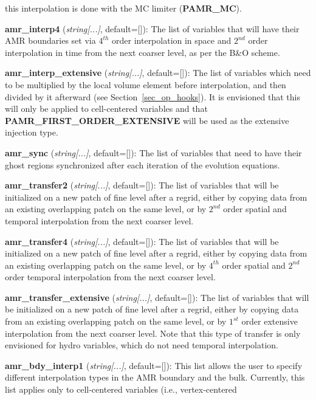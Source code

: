 \documentclass[aps,amssymb,unsortedaddress,nofootinbib]{revtex4}
\def\lsep{\itemsep 0.05in}
\begin{document}
\begin{list}{}{\lsep}
      this interpolation is done with the MC limiter ({\bf PAMR\_MC}).
\item {\bf amr\_interp4} ({\em string[...]}, default=[]):
      The list of variables that will have their AMR boundaries set
      via $4^{th}$ order interpolation in space and $2^{nd}$ order interpolation in time 
      from the next coarser level, as per the B\&O scheme.
\item {\bf amr\_interp\_extensive} ({\em string[...]}, default=[]):
      The list of variables which need to be multiplied by the local volume element
      before interpolation, and then divided by it afterward (see Section~\ref{sec_op_hooks}).
      It is envisioned that this will only be applied to cell-centered variables and that
      {\bf PAMR\_FIRST\_ORDER\_EXTENSIVE} will be used as the extensive injection type.
\item {\bf amr\_sync} ({\em string[...]}, default=[]):
      The list of variables that need to have their ghost regions synchronized
      after each iteration of the evolution equations.
\item {\bf amr\_transfer2} ({\em string[...]}, default=[]):
      The list of variables that will be initialized on a new patch of
      fine level after a regrid, either by copying data from an existing
      overlapping patch on the same level, or by $2^{nd}$ order 
      spatial and temporal interpolation from the next coarser level. 
\item {\bf amr\_transfer4} ({\em string[...]}, default=[]):
      The list of variables that will be initialized on a new patch of
      fine level after a regrid, either by copying data from an existing
      overlapping patch on the same level, or by $4^{th}$ order spatial
      and $2^{nd}$ order temporal interpolation from the next coarser level.
\item {\bf amr\_transfer\_extensive} ({\em string[...]}, default=[]):
      The list of variables that will be initialized on a new patch of
      fine level after a regrid, either by copying data from an existing
      overlapping patch on the same level, or by $1^{st}$ order 
      extensive interpolation from the next coarser level.  Note that this
      type of transfer is only envisioned for hydro variables, which 
      do not need temporal interpolation.  
\item {\bf amr\_bdy\_interp1} ({\em string[...]}, default=[]):
      This list allows the user to specify different interpolation types
      in the AMR boundary and the bulk.  Currently, this list
      applies only to cell-centered variables (i.e., vertex-centered 

\end{list}
\end{document}
